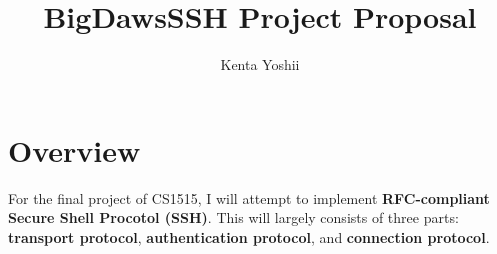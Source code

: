 \documentclass[10pt,sigconf]{acmart}
\begin{document}
\title{BigDawsSSH Project Proposal}

\author{Kenta Yoshii}









%
%




\maketitle

\section{Overview}

For the final project of CS1515, I will attempt to implement \textbf{RFC-compliant Secure Shell Procotol (SSH)}. This will largely consists of three parts: \textbf{transport protocol}, \textbf{authentication protocol}, and \textbf{connection protocol}.
\end{document}
